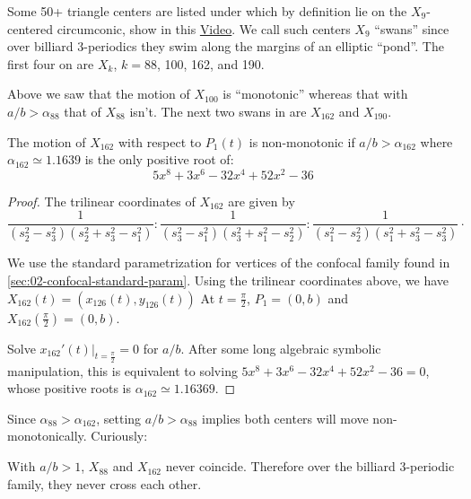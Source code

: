 Some 50+ triangle centers are listed under \cite[X(9)]{etc} which by definition lie on the $X_9$-centered circumconic, show in this \href{https://youtu.be/JdcJt5PExsw}{Video}. We call such centers $X_9$ ``swans'' since over billiard 3-periodics they swim along the margins of an elliptic ``pond''. The first four on \cite{etc} are $X_k$, $k=$88, 100, 162, and 190.

Above we saw that the motion of $X_{100}$ is ``monotonic'' whereas that with $a/b>\alpha_{88}$ that of $X_{88}$ isn't. The next two swans in \cite{etc} are $X_{162}$ and $X_{190}$. 

\begin{proposition}
\label{prop:05-x162}
The motion of $X_{162}$ with respect to $P_1(t)$ is non-monotonic if $a/b>\alpha_{162}$ where $\alpha_{162}{\simeq}1.1639$ is the only positive root of:
\[ 5 x^8 + 3 x^6 - 32 x^4 + 52 x^2 - 36 \]
\end{proposition}

\begin{proof}
The trilinear coordinates of $X_{162}$ are given by
{\small 
\[  \frac {1}{ \left( s_2^{2}-  s_3^{2} \right)  \left( s_2^{2}+ s_3^{2}-
s_1^{2} \right) } :  \frac {1}{ \left( s_3^{2}-  s_1^{2} \right)  \left( s_3^{2}+ s_1^{2} -
s_2^{2} \right) }:\frac {1}{ \left( s_1^{2}-  s_2^{2} \right)  \left( s_1^{2}+ s_3^{2} -
s_3^{2}\right) }\cdot
\]
}

We use the standard parametrization for vertices of the confocal family found in \cref{sec:02-confocal-standard-param}. Using the trilinear coordinates above, we have   $X_{162}(t)=(x_{126}(t), y_{126}(t))$ 
  At $t=\frac{\pi}{2}$, $P_1=(0,b)$ and   $X_{162}(\frac{\pi}{2})= (0,b)$.
  
  Solve $x_{162}'(t)|_{t=\frac{\pi}{2}}=0$ for $a/b$. After some long algebraic symbolic manipulation, this is equivalent to solving $5 x^8 + 3 x^6 - 32 x^4 + 52 x^2 - 36=0$, whose positive roots is $  \alpha_{162} \simeq 1.16369.$
\end{proof}

Since $\alpha_{88}>\alpha_{162}$, setting $a/b>\alpha_{88}$ implies both centers will move non-monotonically. Curiously:

\begin{proposition}
With $a/b>1$, $X_{88}$ and $X_{162}$ never coincide. Therefore over the billiard 3-periodic family, they never cross each other.
\end{proposition}

